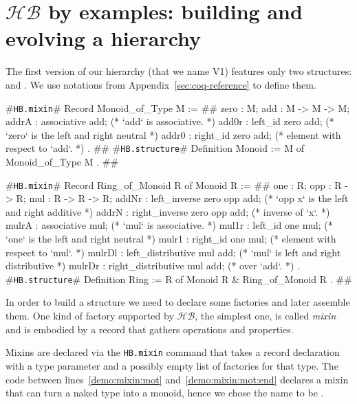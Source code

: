 \documentclass[a4paper,UKenglish,cleveref, autoref]{lipics-v2019}
\newcommand{\HB}{\ensuremath{\mathcal{HB}}}
\newcommand{\mixin}{mixin}
\newcommand{\mixins}{mixins}
\newcommand{\Mixins}{Mixins}
\newcommand{\factory}{factory}
\newcommand{\factories}{factories}
\newcommand{\hbmixin}{{\tt\color{dkgreen}HB.mixin}}
\newcommand{\hbstructure}{{\tt\color{dkgreen}HB.structure}}
\theoremstyle{implem}
\theoremstyle{implem}
\theoremstyle{command}
\theoremstyle{commands}
\begin{document}
\section{\HB{} by examples: building and evolving a hierarchy}
\label{sec:example}

The first version of our hierarchy (that we name V1) features only two
structures:  and . We use notations from Appendix~\ref{sec:coq-reference} to define them.
\begin{coqcode}
#\hbmixin{}# Record Monoid_of_Type M := {                       #\label{demo:mixin:mot}#
  zero : M;
  add : M -> M -> M;
  addrA : associative add;             (* `add` is associative.                   *)
  add0r : left_id zero add;            (* `zero` is the left and right neutral    *)
  addr0 : right_id zero add;           (*   element with respect to `add`.        *)
}.                                                             #\label{demo:mixin:mot:end}#
#\hbstructure{}# Definition Monoid := { M of Monoid_of_Type M }.        #\label{demo:structure:monoid}#

#\hbmixin{}# Record Ring_of_Monoid R of Monoid R := {       #\label{demo:mixin:rom}#
  one : R;
  opp : R -> R;
  mul : R -> R -> R;
  addNr : left_inverse zero opp add;   (* `opp x` is the left and right additive  *)
  addrN : right_inverse zero opp add;  (*   inverse of `x`.                       *)
  mulrA : associative mul;             (* `mul` is associative.                   *)
  mul1r : left_id one mul;             (* `one` is the left and right neutral     *)
  mulr1 : right_id one mul;            (*   element with respect to `mul`.        *)
  mulrDl : left_distributive mul add;  (* `mul` is left and right distributive    *)
  mulrDr : right_distributive mul add; (*   over `add`.                           *)
}.
#\hbstructure{}# Definition Ring := { R of Monoid R & Ring_of_Monoid R }. #\label{demo:structure:ring}#

\end{coqcode}

In order to build a structure we need to declare some \factories{} and
later assemble them. One kind of \factory{} supported by \HB{}, the simplest
one, is called \emph{\mixin{}} and is embodied by a record
that gathers operations and properties.

\Mixins{} are declared via the \hbmixin{} command
that takes a record declaration with
a type parameter and a possibly empty list of \factories{} for that type.
The code between lines~\ref{demo:mixin:mot}
and~\ref{demo:mixin:mot:end} declares a \mixin{} that can turn a naked
type  into a monoid, hence we chose the name to be .
\end{document}
